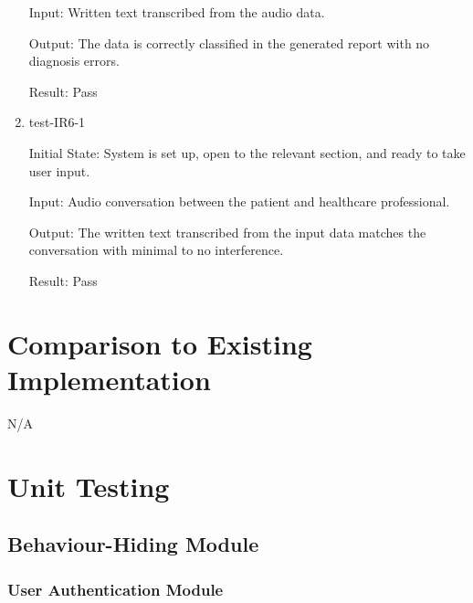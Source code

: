 \documentclass[12pt, titlepage]{article}
\begin{document}
\begin{enumerate}
  Input: Written text transcribed from the audio data.

  Output: The data is correctly classified in the generated report with no diagnosis errors.

  Result: Pass

  \item test-IR6-1 \label{test-IR7-1}

  Initial State: System is set up, open to the relevant section, and ready to take user input.

  Input: Audio conversation between the patient and healthcare professional.

  Output: The written text transcribed from the input data matches the conversation with minimal to no interference.

  Result: Pass

\end{enumerate}


\section{Comparison to Existing Implementation}	

N/A

\section{Unit Testing}

\subsection{Behaviour-Hiding Module}

\subsubsection{User Authentication Module}
\end{document}
